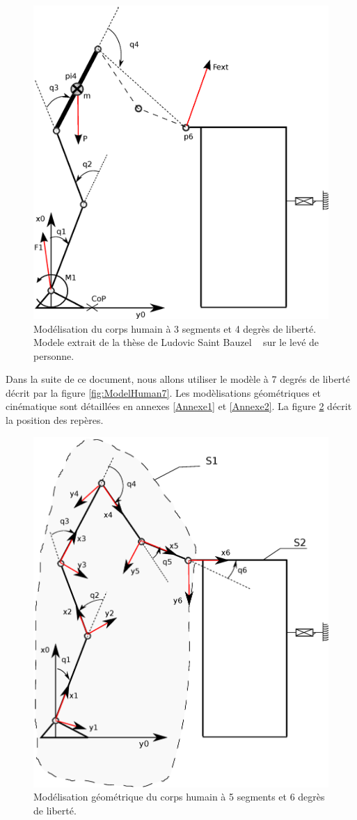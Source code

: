 \documentclass[a4paper, 10pt ]{article}
\begin{document}
\begin{figure}[h]
\centering
\includegraphics[width=0.6\columnwidth]{images/model/modeleHommeQ7simple.eps}
\caption{Modélisation du corps humain à 3 segments et 4 degrès de liberté. Modele extrait de la thèse de Ludovic Saint Bauzel ~\cite{Saint-Bauzel2009} sur le levé de personne.}
\label{fig:ModelHuman4}
\end{figure}



Dans la suite de ce document, nous allons utiliser le modèle à 7 degrés de liberté décrit par la figure \ref{fig:ModelHuman7}.
Les modèlisations géométriques et cinématique sont détaillées en annexes \ref{Annexe1} et \ref{Annexe2}. La figure \ref{fig:ModelHuman7GM} décrit la position des repères.

\begin{figure}[h]
\centering
\includegraphics[width=0.5\columnwidth]{images/model/modeleHommeQ7MG.eps}
\caption{Modélisation géométrique du corps humain à 5 segments et 6 degrès de liberté.}
\label{fig:ModelHuman7GM}
\end{figure}
\end{document}
